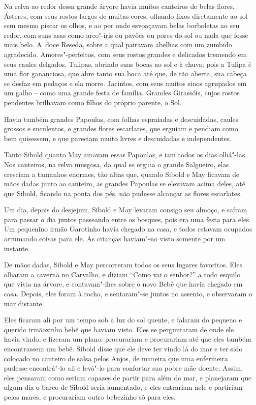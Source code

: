 Na relva ao redor dessa grande árvore havia muitos canteiros de belas
flores. Ásteres, com seus rostos largos de muitas cores, olhando fixos
diretamente ao sol sem mesmo piscar os olhos, e ao por onde esvoaçavam
belas borboletas ao seu redor, com suas asas como arco"-íris ou pavões ou
pores do sol ou nada que fosse mais belo. A~doce Reseda, sobre a qual
pairavam abelhas com um zumbido agradecido. Amores"-perfeitos, com seus
rostos grandes e delicados tremendo em seus caules delgados. Tulipas,
abrindo suas bocas ao sol e à chuva; pois a Tulipa é uma flor
gananciosa, que abre tanto sua boca até que, de tão aberta, sua cabeça
se desfaz em pedaços e ela morre. Jacintos, com seus muitos sinos
agrupados em um galho -- como uma grande festa de família. Grandes
Girassóis, cujos rostos pendentes brilhavam como filhos do próprio
parente, o Sol.

Havia também grandes Papoulas, com folhas espraiadas e descuidadas,
caules grossos e suculentos, e grandes flores escarlates, que erguiam e
pendiam como bem quisessem, e que pareciam muito livres e descuidadas e
independentes.

Tanto Sibold quanto May amavam essas Papoulas, e iam todos os dias
olhá"-las. Nos canteiros, na relva musgosa, da qual se erguia o grande
Salgueiro, elas cresciam a tamanhos enormes, tão altas que, quando
Sibold e May ficavam de mãos dadas junto ao canteiro, as grandes
Papoulas se elevavam acima deles, até que Sibold, ficando na ponta dos
pés, não pudesse alcançar as flores escarlates.

Um dia, depois do desjejum, Sibold e May levaram consigo seu almoço, e
saíram para passar o dia juntos passeando entre os bosques, pois era uma
festa para eles. Um pequenino irmão Garotinho havia chegado na casa, e
todos estavam ocupados arrumando coisas para ele. As crianças haviam"-no
visto somente por um instante.

De mãos dadas, Sibold e May percorreram todos os seus lugares favoritos.
Eles olharam a caverna no Carvalho, e diziam ``Como vai o senhor?'' a
todo esquilo que vivia na árvore, e contavam"-lhes sobre o novo Bebê que
havia chegado em casa. Depois, eles foram à rocha, e sentaram"-se juntos
no assento, e observaram o mar distante.

Eles ficaram ali por um tempo sob a luz do sol quente, e falaram do
pequeno e querido irmãozinho bebê que haviam visto. Eles se perguntaram
de onde ele havia vindo, e fizeram um plano: procurariam e procurariam
até que eles também encontrassem um bebê. Sibold disse que ele deve ter
vindo lá do mar e ter sido colocado no canteiro de salsa pelos Anjos, de
maneira que uma enfermeira pudesse encontrá"-lo ali e levá"-lo para
confortar sua pobre mãe doente. Assim, eles pensaram como seriam capazes
de partir para além do mar, e planejaram que algum dia o barco de Sibold
seria aumentado, e eles entrariam nele e partiriam pelos mares, e
procurariam outro bebezinho só para eles.

